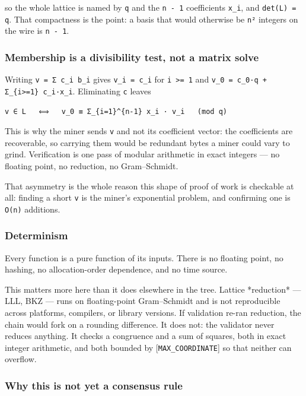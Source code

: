 \documentclass[11pt,a4paper]{article}
\begin{document}
so the whole lattice is named by \texttt{q} and the \texttt{n - 1} coefficients \texttt{x\_i}, and
\texttt{det(L) = q}. That compactness is the point: a basis that would otherwise be
\texttt{n²} integers on the wire is \texttt{n - 1}.

\subsubsection{Membership is a divisibility test, not a matrix solve}

Writing \texttt{v = Σ c\_i b\_i} gives \texttt{v\_i = c\_i} for \texttt{i >= 1} and
\texttt{v\_0 = c\_0·q + Σ\_\{i>=1\} c\_i·x\_i}. Eliminating \texttt{c} leaves

\begin{verbatim}
v ∈ L   ⟺   v_0 ≡ Σ_{i=1}^{n-1} x_i · v_i   (mod q)
\end{verbatim}

This is why the miner sends \texttt{v} and not its coefficient vector: the
coefficients are recoverable, so carrying them would be redundant bytes a
miner could vary to grind. Verification is one pass of modular arithmetic in
exact integers — no floating point, no reduction, no Gram–Schmidt.

That asymmetry is the whole reason this shape of proof of work is checkable
at all: finding a short \texttt{v} is the miner's exponential problem, and
confirming one is \texttt{O(n)} additions.

\subsubsection{Determinism}

Every function is a pure function of its inputs. There is no floating point,
no hashing, no allocation-order dependence, and no time source.

This matters more here than it does elsewhere in the tree. Lattice
*reduction* — LLL, BKZ — runs on floating-point Gram–Schmidt and is not
reproducible across platforms, compilers, or library versions. If validation
re-ran reduction, the chain would fork on a rounding difference. It does
not: the validator never reduces anything. It checks a congruence and a sum
of squares, both in exact integer arithmetic, and both bounded by
[\texttt{MAX\_COORDINATE}] so that neither can overflow.

\subsubsection{Why this is not yet a consensus rule}
\end{document}
